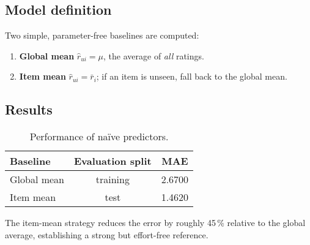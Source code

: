 \subsection*{Model definition}

Two simple, parameter-free baselines are computed:

\begin{enumerate}
  \item \textbf{Global mean}  
        \(\hat r_{ui} = \mu\), the average of \emph{all} ratings.
  \item \textbf{Item mean}  
        \(\hat r_{ui} = \bar r_{i}\); if an item is unseen, fall back to
        the global mean.
\end{enumerate}

\subsection*{Results}

\begin{table}[h]
  \centering
  \begin{tabular}{@{}lcc@{}}
    \toprule
    \textbf{Baseline} & \textbf{Evaluation split} & \textbf{MAE} \\ \midrule
    Global mean & training & 2.6700 \\
    Item mean   & test     & 1.4620 \\ \bottomrule
  \end{tabular}
  \caption{Performance of naïve predictors.}
  \label{tab:naive}
\end{table}

The item-mean strategy reduces the error by roughly 45\,\% relative to the
global average, establishing a strong but effort-free reference.
